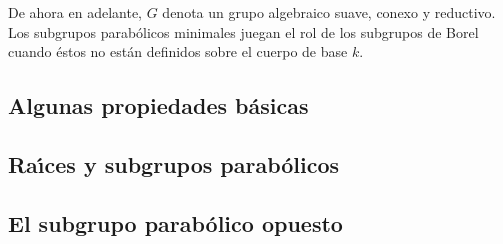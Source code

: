 \theoremstyle{plain}
\newtheorem{teoParabolicosYEscindidos}{Teorema}[section]
\newtheorem{teoParabolicosConjugados}[teoParabolicosYEscindidos]{Teorema}
\newtheorem{teoEscindidosConjugados}[teoParabolicosYEscindidos]{Teorema}
\newtheorem{coroNormalizadorDelEscindido}[teoParabolicosYEscindidos]{Corolario}
\newtheorem{teoParesParabolicoEscindidoConjugados}[teoParabolicosYEscindidos]%
	{Teorema}

\theoremstyle{definition}


De ahora en adelante, $G$ denota un grupo algebraico suave, conexo y reductivo.
Los subgrupos parab\'{o}licos minimales juegan el rol de los subgrupos de
Borel cuando \'{e}stos no est\'{a}n definidos sobre el cuerpo de base $k$.

\subsection{Algunas propiedades b\'{a}sicas}\label{subsec:preliminares}


\subsection{Ra\'{\i}ces y subgrupos parab\'{o}licos}\label{subsec:raices}


\subsection{El subgrupo parab\'{o}lico opuesto}\label{subsec:opuesto}


